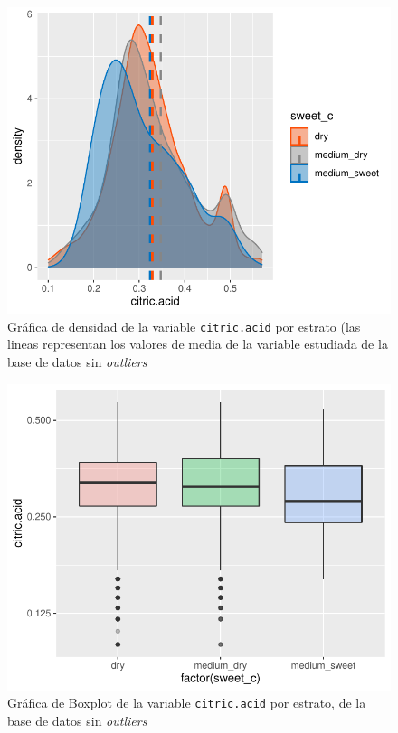 \documentclass[
]{article}
\begin{document}
\begin{figure}
\centering
\includegraphics{test_2_files/figure-latex/desity_plot tidy-1.pdf}
\caption{Gráfica de densidad de la variable \texttt{citric.acid} por
estrato (las lineas representan los valores de media de la variable
estudiada de la base de datos sin \emph{outliers}}
\end{figure}

\begin{figure}
\centering
\includegraphics{test_2_files/figure-latex/Boxplot tidy-1.pdf}
\caption{Gráfica de Boxplot de la variable \texttt{citric.acid} por
estrato, de la base de datos sin \emph{outliers}}
\end{figure}
\end{document}
